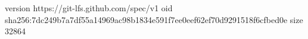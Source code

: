 version https://git-lfs.github.com/spec/v1
oid sha256:7dc249b7a7df55a14969ac98b1834e591f7ee0eef62ef70d9291518f6cfbed0e
size 32864
